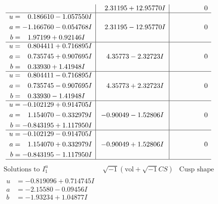\documentclass[1p]{elsarticle_modified}
\theoremstyle{definition}
\newcommand{\I}{\sqrt{-1}}
\begin{document}
$$\begin{array}{c|c|c}
 & \phantom{-}2.31195 + 12.95770 I & \phantom{-0.000000 } 0 \\ \hline\begin{aligned}
u &= \phantom{-}0.186610 - 1.057550 I \\
a &= -1.166760 - 0.054768 I \\
b &= \phantom{-}1.97199 + 0.92146 I\end{aligned}
 & \phantom{-}2.31195 - 12.95770 I & \phantom{-0.000000 } 0 \\ \hline\begin{aligned}
u &= \phantom{-}0.804411 + 0.716895 I \\
a &= \phantom{-}0.735745 + 0.907695 I \\
b &= \phantom{-}0.33930 + 1.41948 I\end{aligned}
 & \phantom{-}4.35773 - 2.32723 I & \phantom{-0.000000 } 0 \\ \hline\begin{aligned}
u &= \phantom{-}0.804411 - 0.716895 I \\
a &= \phantom{-}0.735745 - 0.907695 I \\
b &= \phantom{-}0.33930 - 1.41948 I\end{aligned}
 & \phantom{-}4.35773 + 2.32723 I & \phantom{-0.000000 } 0 \\ \hline\begin{aligned}
u &= -0.102129 + 0.914705 I \\
a &= \phantom{-}1.154070 - 0.332979 I \\
b &= -0.843195 + 1.117950 I\end{aligned}
 & -0.90049 - 1.52806 I & \phantom{-0.000000 } 0 \\ \hline\begin{aligned}
u &= -0.102129 - 0.914705 I \\
a &= \phantom{-}1.154070 + 0.332979 I \\
b &= -0.843195 - 1.117950 I\end{aligned}
 & -0.90049 + 1.52806 I & \phantom{-0.000000 } 0\\
 \hline 
 \end{array}$$\newpage$$\begin{array}{c|c|c}  
\text{Solutions to }I^u_{1}& \I (\text{vol} + \sqrt{-1}CS) & \text{Cusp shape}\\
 \hline 
\begin{aligned}
u &= -0.819096 + 0.714745 I \\
a &= -2.15580 - 0.09456 I \\
b &= -1.93234 + 1.04877 I\end{aligned}

\end{array}$$
\end{document}
